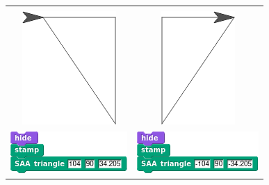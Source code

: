 \documentclass[noauthor,nooutcomes,12pt,hints,handout]{ximera}
\begin{document}
\begin{question}
\begin{freeResponse}
\begin{center}
\begin{tabular}{|c||c|}
      \hline\hline
      &  \\
      \includegraphics{stampStageIII.png} & \includegraphics{stampStageIV.png} \\
      \includegraphics{SAAstampScriptIII.png} & \includegraphics{SAAstampScriptIV.png} \\\hline
    \end{tabular}
  \end{center}
  \end{freeResponse}
\end{question}
\mynewpage
\end{document}
